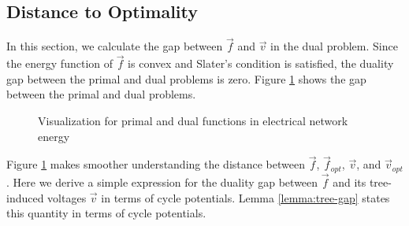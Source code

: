 \subsection{Distance to Optimality}
\label{distance-to-optimality}
In this section, we calculate the gap between $\overrightarrow{f}$ and $\overrightarrow{v}$ in the dual problem. Since the energy function of $\overrightarrow{f}$ is convex and Slater's condition is satisfied, the duality gap between the primal and dual problems is zero. Figure \ref{fig:duality-gap} shows the gap between the primal and dual problems. 
\begin{center}
\begin{figure}[!ht]
\caption{Visualization for primal and dual functions in electrical network energy} 
\label{fig:duality-gap}
\end{figure}
\end{center}
Figure \ref{fig:duality-gap} makes smoother understanding the distance between $\overrightarrow{f}$, $\overrightarrow{f}_{opt}$, $\overrightarrow{v}$, and $\overrightarrow{v}_{opt}$. Here we derive a simple expression for the duality gap between $\overrightarrow{f}$ and its tree-induced voltages $\overrightarrow{v}$ in terms of cycle potentials. Lemma \ref{lemma:tree-gap} states this quantity in terms of cycle potentials.
